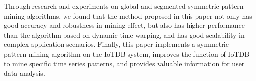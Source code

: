 \begin{abstract*}
  Through research and experiments on global and 
  segmented symmetric pattern mining algorithms, 
  we found that the method proposed in this paper 
  not only has good accuracy and robustness in mining 
  effect, but also has higher performance than the 
  algorithm based on dynamic time warping, 
  and has good scalability in complex application scenarios. 
  Finally, this paper implements a symmetric pattern mining 
  algorithm on the IoTDB system, improves the function 
  of IoTDB to mine specific time series patterns, 
  and provides valuable information for user data analysis.
\end{abstract*}
